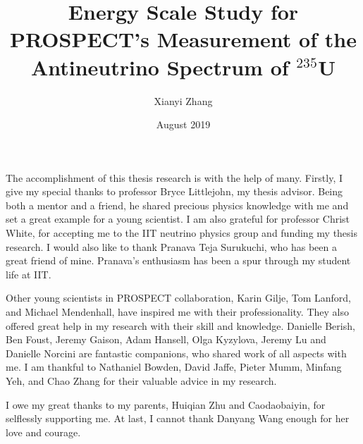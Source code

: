 \documentclass[nofootinbib]{iit}%
\author{Xianyi Zhang}
\title{Energy Scale Study for PROSPECT's Measurement of the Antineutrino Spectrum of $^{235}$U}
\date{August 2019}
\begin{document}
\maketitle

\prelimpages
\begin{acknowledgement}

\setcounter{page}{3}
The accomplishment of this thesis research is with the help of many. Firstly, I give my special thanks to professor Bryce Littlejohn, my thesis advisor. Being both a mentor and a friend, he shared precious physics knowledge with me and set a great example for a young scientist. I am also grateful for professor Christ White, for accepting me to the IIT neutrino physics group and funding my thesis research. I would also like to thank Pranava Teja Surukuchi, who has been a great friend of mine. Pranava's enthusiasm has been a spur through my student life at IIT.

Other young scientists in PROSPECT collaboration, Karin Gilje, Tom Lanford, and Michael Mendenhall, have inspired me with their professionality. They also offered great help in my research with their skill and knowledge. Danielle Berish, Ben Foust, Jeremy Gaison, Adam Hansell, Olga Kyzylova, Jeremy Lu and Danielle Norcini are fantastic companions, who shared work of all aspects with me. I am thankful to  Nathaniel Bowden, David Jaffe, Pieter Mumm, Minfang Yeh, and Chao Zhang for their valuable advice in my research. 

I owe my great thanks to my parents, Huiqian Zhu and Caodaobaiyin, for selflessly supporting me.
At last, I cannot thank Danyang Wang enough for her love and courage.
    
\end{acknowledgement}

\newpage
\tableofcontents

\newpage
\listoftables

\newpage
\listoffigures
\end{document}
